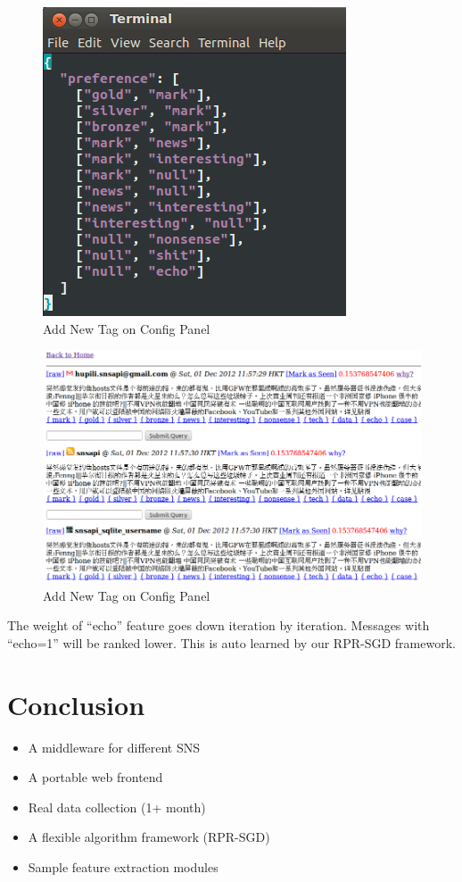 \documentclass{sig-alternate}
\begin{document}
\begin{figure}[h!]
	\centering
	\includegraphics[width=0.7\linewidth]{../pic/echo_preference.png}
	\caption{Add New Tag on Config Panel}
\end{figure}

\begin{figure}[h!]
	\centering
	\includegraphics[width=0.7\linewidth]{../pic/echo_ranked_timeline_before.png}
	\caption{Add New Tag on Config Panel}
\end{figure}


The weight of ``echo'' feature goes down iteration by iteration. Messages with ``echo=1''
will be ranked lower. This is auto learned by our RPR-SGD framework.

\section{Conclusion}
\label{sec:Conclusion}

\begin{itemize}
	\item A middleware for different SNS
	\item A portable web frontend
	\item Real data collection (1+ month)
	\item A flexible algorithm framework (RPR-SGD)
	\item Sample feature extraction modules
\end{itemize}
\end{document}
